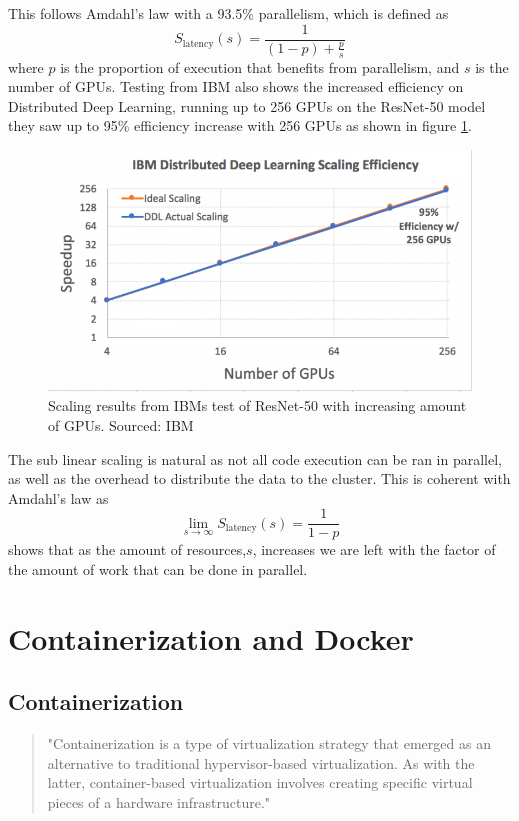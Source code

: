 \documentclass[../main.tex]{subfiles}
\begin{document}
This follows Amdahl's law with a 93.5\% parallelism, which is defined as 
\[
    S_\text{latency}(s) = \frac{1}{(1-p)+\frac{p}{s}}
\]
where $p$ is the proportion of execution that benefits from parallelism, and $s$ is the number of GPUs. Testing from IBM also shows the increased efficiency on Distributed Deep Learning, running up to 256 GPUs on the ResNet-50 model they saw up to 95\% efficiency increase with 256 GPUs as shown in figure \ref{fig:ibm_tensorflow}. \cite{ibm_tensorflow}
\begin{figure}[H]
    \centering
    \includegraphics[scale=.5]{img/ibm_resnet.png}
    \caption{Scaling results from IBMs test of ResNet-50 with increasing amount of GPUs. Sourced: IBM \cite{ibm_tensorflow}}
    \label{fig:ibm_tensorflow}
\end{figure}
The sub linear scaling is natural as not all code execution can be ran in parallel, as well as the overhead to distribute the data to the cluster. This is coherent with Amdahl's law as
\[
    \lim_{s\to\infty}S_\text{latency}(s) = \frac{1}{1-p}
\]
shows that as the amount of resources,$s$, increases we are left with the factor of the amount of work that can be done in parallel.


\pagebreak\section{Containerization and Docker}

\subsection{Containerization}

\begin{quote}
"Containerization is a type of virtualization strategy that emerged as an alternative to traditional hypervisor-based virtualization. As with the latter, container-based virtualization involves creating specific virtual pieces of a hardware infrastructure."
\cite{containerization_def}
\end{quote}
\end{document}
